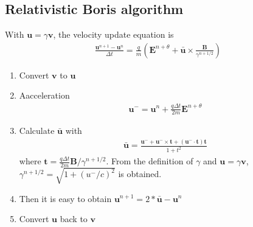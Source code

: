\documentclass[a4paper, 11pt]{article}
\begin{document}
\subsection{Relativistic Boris algorithm}

With $\mathbf{u} = \gamma \mathbf{v}$, the velocity update equation is
\begin{eqnarray}
\frac{\mathbf{u}^{n+1} - \mathbf{u}^{n}}{\Delta t} = \frac{q}{m}(\mathbf{E}^{n+\theta} + \bar{\mathbf{u}}\times \frac{\mathbf{B}}{\gamma ^{n+1/2}})
\end{eqnarray}

\begin{enumerate}
    \item Convert $\mathbf{v}$ to $\mathbf{u}$
    \item Aacceleration
\begin{eqnarray}
    \mathbf{u}^- = \mathbf{u}^{n} + \frac{q\Delta t}{2m}\mathbf{E}^{n+\theta}
\end{eqnarray}

\item Calculate $\bar{\mathbf{u}}$ with
\begin{eqnarray}
\bar{\mathbf{u}} = \frac{\mathbf{u}^- + \mathbf{u}^- \times \mathbf{t} + (\mathbf{u}^- \cdot \mathbf{t})\mathbf{t}}{1+t^2}
\end{eqnarray}
where $\mathbf{t} = \frac{q\Delta t}{2m} \mathbf{B}/\gamma^{n+1/2}$. From the definition of $\gamma$ and $\mathbf{u} = \gamma \mathbf{v}$, $\gamma ^{n+1/2} = \sqrt{1+(u^-/c)^2}$ is obtained. 

\item Then it is easy to obtain $\mathbf{u}^{n+1} = 2*\bar{\mathbf{u}} - \mathbf{u}^{n}$
\item  Convert $\mathbf{u}$ back to $\mathbf{v}$
\end{enumerate}
\end{document}
